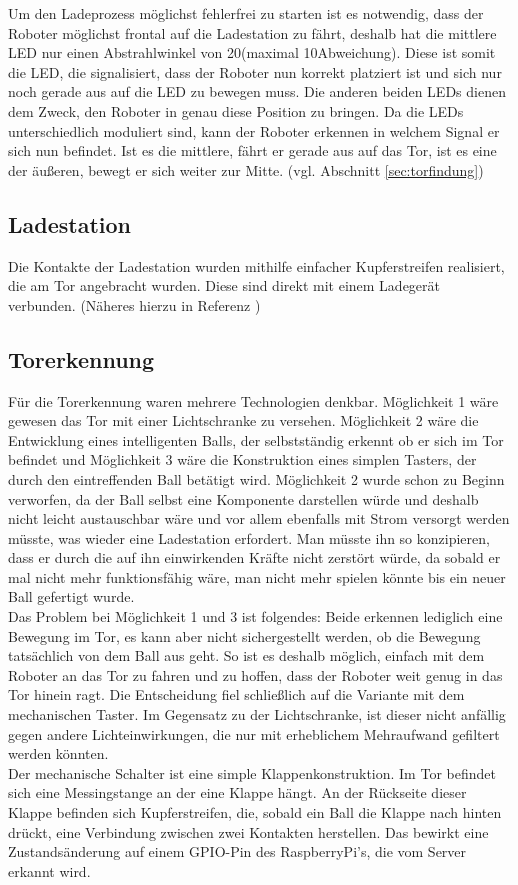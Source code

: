 Um den Ladeprozess möglichst fehlerfrei zu starten ist es notwendig, dass der Roboter möglichst frontal auf die Ladestation zu fährt, deshalb hat die mittlere LED nur einen Abstrahlwinkel von 20\degree  (maximal 10\degree  Abweichung). Diese ist somit die LED, die signalisiert, dass der Roboter nun korrekt platziert ist und sich nur noch gerade aus auf die LED zu bewegen muss. Die anderen beiden LEDs dienen dem Zweck, den Roboter in genau diese Position zu bringen. Da die LEDs unterschiedlich moduliert sind, kann der Roboter erkennen in welchem Signal er sich nun befindet. Ist es die mittlere, fährt er gerade aus auf das Tor, ist es eine der äußeren, bewegt er sich weiter zur Mitte. (vgl. Abschnitt \ref{sec:torfindung})


\subsection{Ladestation}
Die Kontakte der Ladestation wurden mithilfe einfacher Kupferstreifen realisiert, die am Tor angebracht wurden. Diese sind direkt mit einem Ladegerät verbunden. (Näheres hierzu in Referenz \cite{ALEX})

\subsection{Torerkennung}
Für die Torerkennung waren mehrere Technologien denkbar. Möglichkeit 1 wäre gewesen das Tor mit einer Lichtschranke zu versehen. Möglichkeit 2 wäre die Entwicklung eines intelligenten Balls, der selbstständig erkennt ob er sich im Tor befindet und Möglichkeit 3 wäre die Konstruktion eines simplen Tasters, der durch den eintreffenden Ball betätigt wird.
Möglichkeit 2 wurde schon zu Beginn verworfen, da der Ball selbst eine Komponente darstellen würde und deshalb nicht leicht austauschbar wäre und vor allem ebenfalls mit Strom versorgt werden müsste, was wieder eine Ladestation erfordert. Man müsste ihn so konzipieren, dass er durch die auf ihn einwirkenden Kräfte nicht zerstört würde, da sobald er mal nicht mehr funktionsfähig wäre, man nicht mehr spielen könnte bis ein neuer Ball gefertigt wurde. \\
Das Problem bei Möglichkeit 1 und 3 ist folgendes: Beide erkennen lediglich eine Bewegung im Tor, es kann aber nicht sichergestellt werden, ob die Bewegung tatsächlich von dem Ball aus geht. So ist es deshalb möglich, einfach mit dem Roboter an das Tor zu fahren und zu hoffen, dass der Roboter weit genug in das Tor hinein ragt. Die Entscheidung fiel schließlich auf die Variante mit dem mechanischen Taster. Im Gegensatz zu der Lichtschranke, ist dieser nicht anfällig gegen andere Lichteinwirkungen, die nur mit erheblichem Mehraufwand gefiltert werden könnten. \\
Der mechanische Schalter ist eine simple \glqq Klappenkonstruktion\grqq. Im Tor befindet sich eine Messingstange an der eine Klappe hängt. An der Rückseite dieser Klappe befinden sich Kupferstreifen, die, sobald ein Ball die Klappe nach hinten drückt, eine Verbindung zwischen zwei Kontakten herstellen. Das bewirkt eine Zustandsänderung auf einem GPIO-Pin des RaspberryPi's, die vom Server erkannt wird.

